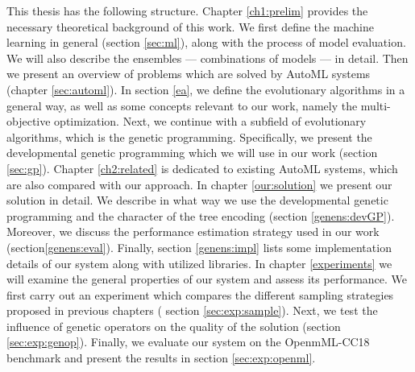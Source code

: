 This thesis has the following structure. Chapter \ref{ch1:prelim} provides the
necessary theoretical background of this work. We first define the machine
learning in general (section \ref{sec:ml}), along with the process of model
evaluation. We will also describe the ensembles --- combinations of models
--- in detail. Then we present an overview of problems which are solved by
AutoML systems (chapter \ref{sec:automl}). In section \ref{ea}, we define the
evolutionary algorithms in a general way, as well as some concepts relevant
to our work, namely the multi-objective optimization. Next, we continue with
a subfield of evolutionary algorithms, which is the genetic programming.
Specifically, we present the developmental genetic programming which we will
use in our work (section \ref{sec:gp}). 
Chapter \ref{ch2:related} is dedicated to existing AutoML systems, which are
also compared with our approach.
In chapter \ref{our:solution} we present our solution in detail. We describe
in what way we use the developmental genetic programming and the character of
the tree encoding (section \ref{genens:devGP}). Moreover, we discuss the
performance estimation strategy used in our work (section\ref{genens:eval}).
Finally, section \ref{genens:impl} lists some implementation details of our
system along with utilized libraries.
In chapter \ref{experiments} we will examine the general properties of our
system and assess its performance. We first carry out an experiment which
compares the different sampling strategies proposed in previous chapters (
section \ref{sec:exp:sample}). Next, we test the influence of genetic
operators on the quality of the solution (section \ref{sec:exp:genop}).
Finally, we evaluate our system on the OpenmML-CC18 benchmark and present the
results in section \ref{sec:exp:openml}.